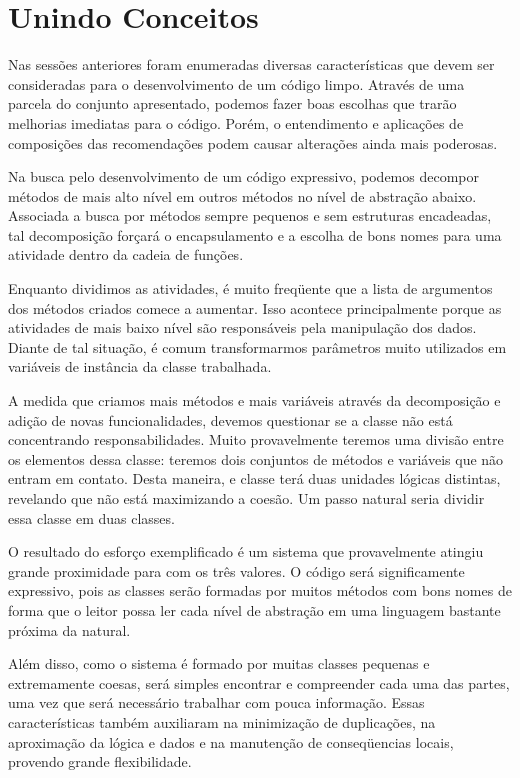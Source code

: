 \section{Unindo Conceitos}
\label{unindo_conceitos}

Nas sessões anteriores foram enumeradas diversas características que devem ser consideradas para o desenvolvimento de um código limpo. Através de uma parcela do conjunto apresentado, podemos fazer boas escolhas que trarão melhorias imediatas para o código. Porém, o entendimento e aplicações de composições das recomendações podem causar alterações ainda mais poderosas.

Na busca pelo desenvolvimento de um código expressivo, podemos decompor métodos de mais alto nível em outros métodos no nível de abstração abaixo. Associada a busca por métodos sempre pequenos e sem estruturas encadeadas, tal decomposição forçará o encapsulamento e a escolha de bons nomes para uma atividade dentro da cadeia de funções.

Enquanto dividimos as atividades, é muito freqüente que a lista de argumentos dos métodos criados comece a aumentar. Isso acontece principalmente porque as atividades de mais baixo nível são responsáveis pela manipulação dos dados. Diante de tal situação, é comum transformarmos parâmetros muito utilizados em variáveis de instância da classe trabalhada.

A medida que criamos mais métodos e mais variáveis através da decomposição e adição de novas funcionalidades, devemos questionar se a classe não está concentrando responsabilidades. Muito provavelmente teremos uma divisão entre os elementos dessa classe: teremos dois conjuntos de métodos e variáveis que não entram em contato. Desta maneira, e classe terá duas unidades lógicas distintas, revelando que não está maximizando a coesão. Um passo natural seria dividir essa classe em duas classes. 

O resultado do esforço exemplificado é um sistema que provavelmente atingiu grande proximidade para com os três valores. O código será significamente expressivo, pois as classes serão formadas por muitos métodos com bons nomes de forma que o leitor possa ler cada nível de abstração em uma linguagem bastante próxima da natural.

Além disso, como o sistema é formado por muitas classes pequenas e extremamente coesas, será simples encontrar e compreender cada uma das partes, uma vez que será necessário trabalhar com pouca informação. Essas características também auxiliaram na minimização de duplicações, na aproximação da lógica e dados e na manutenção de conseqüencias locais, provendo grande flexibilidade.
